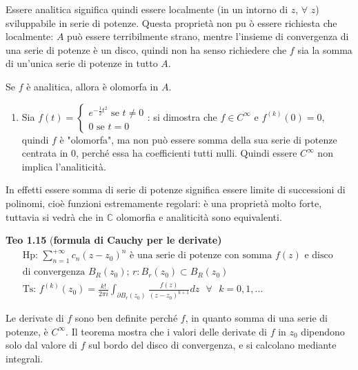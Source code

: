 \documentclass{article}
\begin{document}
Essere analitica significa quindi essere localmente (in un intorno di $z$, $%
\forall $ $z$) sviluppabile in serie di potenze. Questa propriet\`{a} non pu%
\`{o} essere richiesta che localmente: $A$ pu\`{o} essere terribilmente
strano, mentre l'insieme di convergenza di una serie di potenze \`{e} un
disco, quindi non ha senso richiedere che $f$ sia la somma di un'unica serie
di potenze in tutto $A$.

Se $f$ \`{e} analitica, allora \`{e} olomorfa in $A$.

\begin{enumerate}
\item Sia $f\left( t\right) =\left\{ 
\begin{array}{c}
e^{-\frac{1}{2}t^{2}}\text{ se }t\neq 0 \\ 
0\text{ se }t=0%
\end{array}%
\right. $: si dimostra che $f\in C^{\infty }$ e $f^{\left( k\right) }\left(
0\right) =0$, quindi $f$ \`{e} "olomorfa", ma non pu\`{o} essere somma della
sua serie di potenze centrata in $0$, perch\'{e} essa ha coefficienti tutti
nulli. Quindi essere $C^{\infty }$ non implica l'analiticit\`{a}.
\end{enumerate}

In effetti essere somma di serie di potenze significa essere limite di
successioni di polinomi, cio\`{e} funzioni estremamente regolari: \`{e} una
propriet\`{a} molto forte, tuttavia si vedr\`{a} che in $%
\mathbb{C}
$ olomorfia e analiticit\`{a} sono equivalenti.

\textbf{Teo 1.15 }(\textbf{formula di Cauchy per le derivate)}%
\begin{gather*}
\text{Hp: }\sum_{n=1}^{+\infty }c_{n}\left( z-z_{0}\right) ^{n}\text{ \`{e}
una serie di potenze con somma }f\left( z\right) \text{ e disco } \\
\text{di convergenza }B_{R}\left( z_{0}\right) \text{; }r:B_{r}\left(
z_{0}\right) \subset B_{R}\left( z_{0}\right) \\
\text{Ts: }f^{\left( k\right) }\left( z_{0}\right) =\frac{k!}{2\pi i}%
\int_{\partial B_{r}\left( z_{0}\right) }\frac{f\left( z\right) }{\left(
z-z_{0}\right) ^{k+1}}dz\text{ }\forall \text{ }k=0,1,...
\end{gather*}

Le derivate di $f$ sono ben definite perch\'{e} $f$, in quanto somma di una
serie di potenze, \`{e} $C^{\infty }$. Il teorema mostra che i valori delle
derivate di $f$ in $z_{0}$ dipendono solo dal valore di $f$ sul bordo del
disco di convergenza, e si calcolano mediante integrali.
\end{document}
